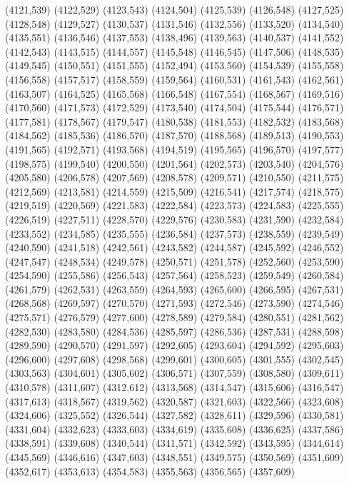 (4121,539)
(4122,529)
(4123,543)
(4124,504)
(4125,539)
(4126,548)
(4127,525)
(4128,548)
(4129,527)
(4130,537)
(4131,546)
(4132,556)
(4133,520)
(4134,540)
(4135,551)
(4136,546)
(4137,553)
(4138,496)
(4139,563)
(4140,537)
(4141,552)
(4142,543)
(4143,515)
(4144,557)
(4145,548)
(4146,545)
(4147,506)
(4148,535)
(4149,545)
(4150,551)
(4151,555)
(4152,494)
(4153,560)
(4154,539)
(4155,558)
(4156,558)
(4157,517)
(4158,559)
(4159,564)
(4160,531)
(4161,543)
(4162,561)
(4163,507)
(4164,525)
(4165,568)
(4166,548)
(4167,554)
(4168,567)
(4169,516)
(4170,560)
(4171,573)
(4172,529)
(4173,540)
(4174,504)
(4175,544)
(4176,571)
(4177,581)
(4178,567)
(4179,547)
(4180,538)
(4181,553)
(4182,532)
(4183,568)
(4184,562)
(4185,536)
(4186,570)
(4187,570)
(4188,568)
(4189,513)
(4190,553)
(4191,565)
(4192,571)
(4193,568)
(4194,519)
(4195,565)
(4196,570)
(4197,577)
(4198,575)
(4199,540)
(4200,550)
(4201,564)
(4202,573)
(4203,540)
(4204,576)
(4205,580)
(4206,578)
(4207,569)
(4208,578)
(4209,571)
(4210,550)
(4211,575)
(4212,569)
(4213,581)
(4214,559)
(4215,509)
(4216,541)
(4217,574)
(4218,575)
(4219,519)
(4220,569)
(4221,583)
(4222,584)
(4223,573)
(4224,583)
(4225,555)
(4226,519)
(4227,511)
(4228,570)
(4229,576)
(4230,583)
(4231,590)
(4232,584)
(4233,552)
(4234,585)
(4235,555)
(4236,584)
(4237,573)
(4238,559)
(4239,549)
(4240,590)
(4241,518)
(4242,561)
(4243,582)
(4244,587)
(4245,592)
(4246,552)
(4247,547)
(4248,534)
(4249,578)
(4250,571)
(4251,578)
(4252,560)
(4253,590)
(4254,590)
(4255,586)
(4256,543)
(4257,564)
(4258,523)
(4259,549)
(4260,584)
(4261,579)
(4262,531)
(4263,559)
(4264,593)
(4265,600)
(4266,595)
(4267,531)
(4268,568)
(4269,597)
(4270,570)
(4271,593)
(4272,546)
(4273,590)
(4274,546)
(4275,571)
(4276,579)
(4277,600)
(4278,589)
(4279,584)
(4280,551)
(4281,562)
(4282,530)
(4283,580)
(4284,536)
(4285,597)
(4286,536)
(4287,531)
(4288,598)
(4289,590)
(4290,570)
(4291,597)
(4292,605)
(4293,604)
(4294,592)
(4295,603)
(4296,600)
(4297,608)
(4298,568)
(4299,601)
(4300,605)
(4301,555)
(4302,545)
(4303,563)
(4304,601)
(4305,602)
(4306,571)
(4307,559)
(4308,580)
(4309,611)
(4310,578)
(4311,607)
(4312,612)
(4313,568)
(4314,547)
(4315,606)
(4316,547)
(4317,613)
(4318,567)
(4319,562)
(4320,587)
(4321,603)
(4322,566)
(4323,608)
(4324,606)
(4325,552)
(4326,544)
(4327,582)
(4328,611)
(4329,596)
(4330,581)
(4331,604)
(4332,623)
(4333,603)
(4334,619)
(4335,608)
(4336,625)
(4337,586)
(4338,591)
(4339,608)
(4340,544)
(4341,571)
(4342,592)
(4343,595)
(4344,614)
(4345,569)
(4346,616)
(4347,603)
(4348,551)
(4349,575)
(4350,569)
(4351,609)
(4352,617)
(4353,613)
(4354,583)
(4355,563)
(4356,565)
(4357,609)
